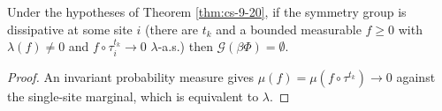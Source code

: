 \begin{corollary}[Georgii (9.24)]
    \label{cor:cs-9-24}
    \leanok

    Under the hypotheses of Theorem \ref{thm:cs-9-20}, if the symmetry group is dissipative
    at some site $i$ (there are $t_k$ and a bounded measurable $f \geq 0$ with
    $\lambda(f) \neq 0$ and $f \circ \tau_i^{t_k} \to 0$ $\lambda$-a.s.) then
    $\mathcal G(\beta\Phi) = \emptyset$.
\end{corollary}
\begin{proof}
    \leanok
    An invariant probability measure gives $\mu(f) = \mu(f\circ\tau^{t_k}) \to 0$ against the
    single-site marginal, which is equivalent to $\lambda$.
\end{proof}
